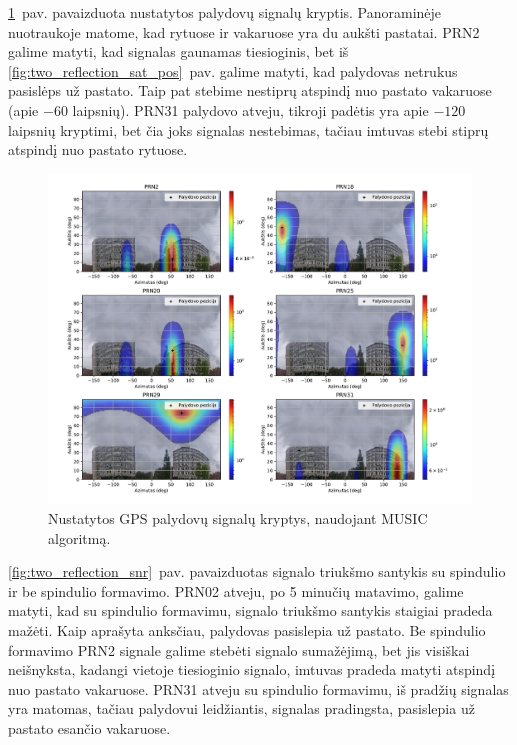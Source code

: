 \documentclass[main.tex]{subfiles}
\begin{document}
\ref{fig:two_reflection}~pav. pavaizduota nustatytos palydovų signalų kryptis.
Panoraminėje nuotraukoje matome, kad rytuose ir vakaruose yra du aukšti pastatai.
PRN2 galime matyti, kad signalas gaunamas tiesioginis, bet iš
\ref{fig:two_reflection_sat_pos}~pav. galime matyti, kad palydovas netrukus
pasislėps už pastato. Taip pat stebime nestiprų atspindį nuo pastato vakaruose
(apie $-60$ laipsnių). PRN31 palydovo atveju, tikroji padėtis yra apie $-120$
laipsnių kryptimi, bet čia joks signalas nestebimas, tačiau imtuvas stebi stiprų
atspindį nuo pastato rytuose.

\begin{figure}[ht]
    \begin{centering}
    \includegraphics[scale=0.50]{drawings/two_reflections}
    \par\end{centering}
    \protect\caption{\label{fig:two_reflection}Nustatytos GPS palydovų signalų kryptys, naudojant MUSIC algoritmą.}
\end{figure}

\ref{fig:two_reflection_snr}~pav. pavaizduotas signalo triukšmo santykis su spindulio
ir be spindulio formavimo.  PRN02 atveju, po 5 minučių matavimo, galime
matyti, kad su spindulio formavimu,
signalo triukšmo santykis staigiai pradeda mažėti. Kaip aprašyta anksčiau, palydovas
pasislepia už pastato. Be spindulio formavimo PRN2 signale galime
stebėti signalo sumažėjimą, bet jis visiškai neišnyksta, kadangi
vietoje tiesioginio signalo, imtuvas pradeda matyti atspindį nuo pastato vakaruose.
PRN31 atveju su spindulio formavimu, iš pradžių signalas yra matomas, tačiau palydovui
leidžiantis, signalas pradingsta, pasislepia už pastato esančio vakaruose.
\end{document}
